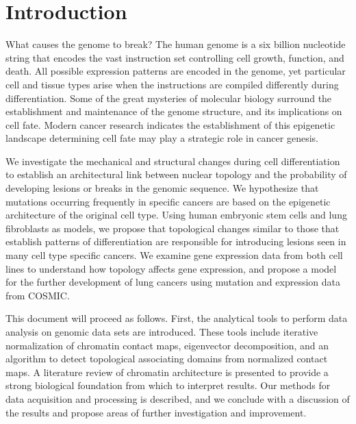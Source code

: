 
\chapter{Introduction}

What causes the genome to break?  The human genome is a six billion nucleotide string that encodes the vast instruction set
controlling cell growth, function, and death.  All possible expression patterns are encoded in the genome, yet particular
cell and tissue types arise when the instructions are compiled differently during differentiation.  Some of the great mysteries
of molecular biology surround the establishment and maintenance of the genome structure, and its implications on cell fate.  
Modern cancer research indicates the establishment of this \gls{epigenetic} landscape determining cell fate may play a
strategic role in cancer genesis.

We investigate the mechanical and structural changes during cell differentiation to establish an architectural link between
nuclear topology and the probability of developing lesions or breaks in the genomic sequence.  We hypothesize that mutations
occurring frequently in specific cancers are based on the epigenetic architecture of the original cell type.  Using human
embryonic stem cells and lung fibroblasts as models, we propose that topological changes similar to those that establish
patterns of differentiation are responsible for introducing lesions seen in many cell type specific cancers.  We examine
gene expression data from both cell lines to understand how topology affects gene expression, and propose a model
for the further development of lung cancers using mutation and expression data from \gls{COSMIC}.

This document will proceed as follows.  First, the analytical tools to perform data analysis on genomic data sets are introduced.
These tools include iterative normalization of chromatin contact maps, eigenvector decomposition, and an algorithm to detect
topological associating domains from normalized contact maps.  A literature review of chromatin architecture is presented to
provide a strong biological foundation from which to interpret results.  Our methods for data acquisition and processing is
described, and we conclude with a discussion of the results and propose areas of further investigation and improvement.
